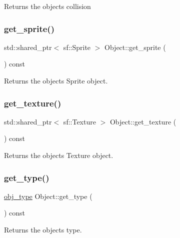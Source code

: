 Returns the objects collision \mbox{\label{classObject_a1a7f0c8e9026cbc075d3b34a96541a15}} 
\subsubsection{\texorpdfstring{get\+\_\+sprite()}{get\_sprite()}}
{\footnotesize\ttfamily std\+::shared\+\_\+ptr$<$ sf\+::\+Sprite $>$ Object\+::get\+\_\+sprite (\begin{DoxyParamCaption}{ }\end{DoxyParamCaption}) const}

Returns the objects Sprite object. \mbox{\label{classObject_ad41bf244fcffe688f67d7d4a3005a05c}} 
\subsubsection{\texorpdfstring{get\+\_\+texture()}{get\_texture()}}
{\footnotesize\ttfamily std\+::shared\+\_\+ptr$<$ sf\+::\+Texture $>$ Object\+::get\+\_\+texture (\begin{DoxyParamCaption}{ }\end{DoxyParamCaption}) const}

Returns the objects Texture object. \mbox{\label{classObject_ae80b139cddd1174e4fa87255df3c90c3}} 
\subsubsection{\texorpdfstring{get\+\_\+type()}{get\_type()}}
{\footnotesize\ttfamily \hyperlink{Object_8h_ac87c026b772bad1b7bb6edea6200fc92}{obj\+\_\+type} Object\+::get\+\_\+type (\begin{DoxyParamCaption}{ }\end{DoxyParamCaption}) const}

Returns the objects type. \mbox{\label{classObject_a5813543f4d10da55932ed5dafb82816f}} 
